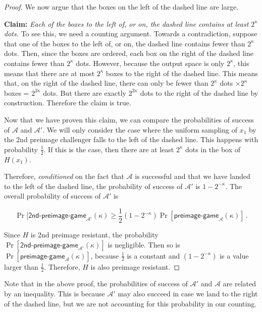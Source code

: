 \begin{proof}
  We now argue that the boxes on the left of the dashed line are large.

  \textbf{Claim: } \emph{Each of the boxes to the left of, or on, the dashed line contains at least $2^\kappa$ dots.} To see this, we need a counting argument. Towards a contradiction, suppose that one of the boxes to the left of, or on, the dashed line contains fewer than $2^\kappa$ dots. Then, since the boxes are ordered, each box on the right of the dashed line contains fewer than $2^\kappa$ dots. However, because the output space is only $2^\kappa$, this means that there are at most $2^\kappa$ boxes to the right of the dashed line. This means that, on the right of the dashed line, there can only be fewer than $2^\kappa$ dots $\times 2^\kappa$ boxes = $2^{2\kappa}$ dots. But there are exactly $2^{2\kappa}$ dots to the right of the dashed line by construction. Therefore the claim is true.

  Now that we have proven this claim, we can compare the probabilities of success of $\mathcal{A}$ and $\mathcal{A}'$. We will only consider the case where the uniform sampling of $x_1$ by the 2nd preimage challenger falls to the left of the dashed line. This happens with probability $\frac{1}{2}$. If this is the case, then there are at least $2^{\kappa}$ dots in the box of $H(x_1)$.

  Therefore, \emph{conditioned} on the fact that $\mathcal{A}$ is successful and that we have landed to the left of the dashed line, the probability of success of $\mathcal{A}'$ is $1 - 2^{-\kappa}$. The overall probability of success of $\mathcal{A}'$ is

  \[
    \Pr[\textsf{2nd-preimage-game}_{\mathcal{A}'}(\kappa) \geq \frac{1}{2} (1 - 2^{-\kappa}) \Pr[\textsf{preimage-game}_\mathcal{A}(\kappa)]\,.
  \]

  Since $H$ is 2nd preimage resistant, the probability $\Pr[\textsf{2nd-preimage-game}_{\mathcal{A}'}(\kappa)]$ is negligible.
  Then so is $\Pr[\textsf{preimage-game}_\mathcal{A}(\kappa)]$, because $\frac{1}{2}$ is a constant and $(1 - 2^{-\kappa})$ is a value larger than $\frac{1}{2}$. Therefore, $H$ is also preimage resistant.
\end{proof}

Note that in the above proof, the probabilities of success of $\mathcal{A}'$
and $\mathcal{A}$ are related by an inequality. This is because $\mathcal{A}'$
may also succeed in case we land to the right of the dashed line, but we are not
accounting for this probability in our counting.

